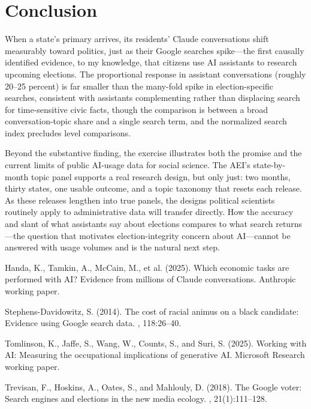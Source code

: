 \documentclass[12pt]{article}
\begin{document}
\section*{Conclusion}

When a state's primary arrives, its residents' Claude conversations shift measurably toward politics, just as their Google searches spike---the first causally identified evidence, to my knowledge, that citizens use AI assistants to research upcoming elections. The proportional response in assistant conversations (roughly 20--25 percent) is far smaller than the many-fold spike in election-specific searches, consistent with assistants complementing rather than displacing search for time-sensitive civic facts, though the comparison is between a broad conversation-topic share and a single search term, and the normalized search index precludes level comparisons.

Beyond the substantive finding, the exercise illustrates both the promise and the current limits of public AI-usage data for social science. The AEI's state-by-month topic panel supports a real research design, but only just: two months, thirty states, one usable outcome, and a topic taxonomy that resets each release. As these releases lengthen into true panels, the designs political scientists routinely apply to administrative data will transfer directly. How the accuracy and slant of what assistants say about elections compares to what search returns---the question that motivates election-integrity concern about AI---cannot be answered with usage volumes and is the natural next step.


\begin{thebibliography}{}

Handa, K., Tamkin, A., McCain, M., et al. (2025).
\newblock Which economic tasks are performed with AI? Evidence from millions of Claude conversations.
\newblock Anthropic working paper.

Stephens-Davidowitz, S. (2014).
\newblock The cost of racial animus on a black candidate: Evidence using Google search data.
, 118:26--40.

Tomlinson, K., Jaffe, S., Wang, W., Counts, S., and Suri, S. (2025).
\newblock Working with AI: Measuring the occupational implications of generative AI.
\newblock Microsoft Research working paper.

Trevisan, F., Hoskins, A., Oates, S., and Mahlouly, D. (2018).
\newblock The Google voter: Search engines and elections in the new media ecology.
, 21(1):111--128.

\end{thebibliography}
\end{document}
